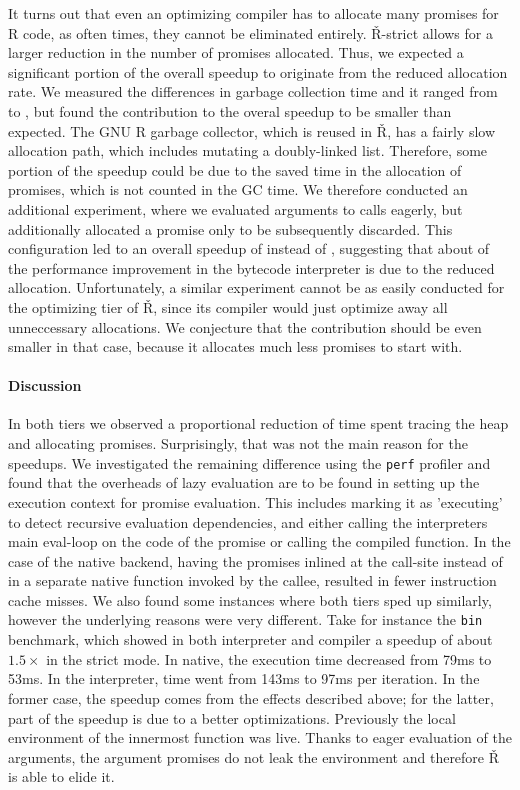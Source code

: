 \documentclass[review,nonacm,screen,acmsmall,anonymous=true]{acmart}
\renewcommand{\Rsh}{{\sf\v R}\xspace}
\newcommand{\Rshstrict}{{\sf\v R-strict}\xspace}
\begin{document}
It turns out that even an optimizing compiler has to allocate many promises for R
code, as often times, they cannot be eliminated entirely. \Rshstrict allows for
a larger reduction in the number of promises allocated.
Thus, we expected a significant portion of the overall speedup to originate from
the reduced allocation rate. We measured the differences in garbage collection
time and it ranged from \speedupGCRshStrictMin to \speedupGCRshStrictMax, but
found the contribution to the overal speedup to be smaller than expected.
The GNU R garbage collector, which is reused in \Rsh, has a fairly slow allocation path, which
includes mutating a doubly-linked list. Therefore, some portion of the speedup
could be due to the saved time in the allocation of promises, which is not counted in the GC time.
We therefore conducted an additional experiment, where we evaluated arguments to
calls eagerly, but additionally allocated a promise only to be subsequently discarded.
This configuration led to an overall speedup of
\speedupBCRshStrictAlloc instead of \speedupBCRshStrict, suggesting that
about \speedupDueToReducedGC of the performance improvement in the bytecode interpreter is due to the
reduced allocation. Unfortunately, a similar experiment cannot be as easily conducted
for the optimizing tier of \Rsh, since its compiler would just optimize away all
unneccessary allocations. We conjecture that the contribution should be even
smaller in that case, because it allocates much less promises to start with.

\paragraph{Discussion}

In both tiers we observed a proportional reduction of time spent tracing the
heap and allocating promises. Surprisingly, that was not the main reason
for the speedups. We investigated the remaining difference using the
\lstinline{perf} profiler and found that the overheads of lazy evaluation are to
be found in setting up the execution context for promise evaluation. This
includes marking it as 'executing' to detect recursive evaluation dependencies,
and either calling the interpreters main eval-loop on the code of the promise or
calling the compiled function. In the case of the native backend, having the
promises inlined at the call-site instead of in a separate native function
invoked by the callee, resulted in fewer instruction cache misses. We also found
some instances where both tiers sped up similarly, however the underlying
reasons were very different. Take for instance the \lstinline{bin} benchmark,
which showed in both interpreter and compiler a speedup of about $1.5\times$ in
the strict mode. In native, the execution time decreased from 79ms to 53ms. In
the interpreter, time went from 143ms to 97ms per iteration. In the former case,
the speedup comes from the effects described above; for the latter, part of the
speedup is due to a better optimizations. Previously the local environment of
the innermost function was live. Thanks to eager evaluation of the arguments,
the argument promises do not leak the environment and therefore \Rsh is able to
elide it.
\end{document}
